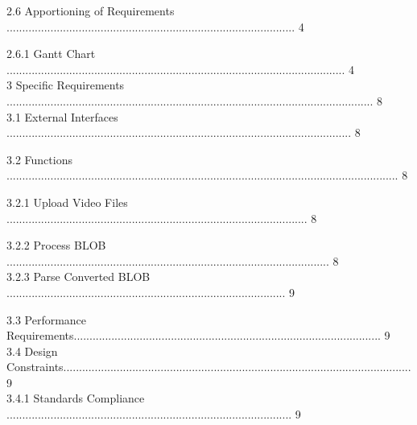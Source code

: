\documentclass[10pt,draftclsnofoot,onecolumn]{IEEEtran}
\newcommand\tab[1][1cm]{\hspace*{#1}}
\begin{document}
\tab 2.6 Apportioning of Requirements ............................................................................................ 4\\
                 \vspace{5mm}

\tab\tab 2.6.1 Gantt Chart ............................................................................................................ 4\\
                 \vspace{5mm}
3 Specific Requirements ..................................................................................................................... 8\\
                 \vspace{5mm}
\tab 3.1 External Interfaces .............................................................................................................. 8\\
                 \vspace{5mm}

\tab 3.2 Functions ............................................................................................................................. 8\\
                 \vspace{5mm}

\tab \tab 3.2.1 Upload Video Files ................................................................................................ 8\\
                 \vspace{5mm}

\tab \tab 3.2.2 Process BLOB ....................................................................................................... 8\\
                 \vspace{5mm}
\tab \tab 3.2.3 Parse Converted BLOB ......................................................................................... 9\\
                 \vspace{5mm}

\tab 3.3 Performance Requirements.................................................................................................. 9\\
                 \vspace{5mm}
\tab 3.4 Design Constraints............................................................................................................... 9\\
                 \vspace{5mm}
\tab \tab 3.4.1 Standards Compliance ........................................................................................... 9\\
                 \vspace{5mm}
\end{document}
